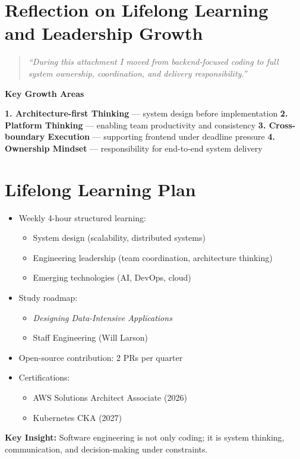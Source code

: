 \section{Reflection on Lifelong Learning and Leadership Growth}

\begin{quote}
\textit{“During this attachment I moved from backend-focused coding to full system ownership, coordination, and delivery responsibility.”}
\end{quote}

\textbf{Key Growth Areas}

\textbf{1. Architecture-first Thinking} --- system design before implementation  
\textbf{2. Platform Thinking} --- enabling team productivity and consistency  
\textbf{3. Cross-boundary Execution} --- supporting frontend under deadline pressure  
\textbf{4. Ownership Mindset} --- responsibility for end-to-end system delivery  

\section{Lifelong Learning Plan}

\begin{itemize}
\item Weekly 4-hour structured learning:
  \begin{itemize}
  \item System design (scalability, distributed systems)
  \item Engineering leadership (team coordination, architecture thinking)
  \item Emerging technologies (AI, DevOps, cloud)
  \end{itemize}

\item Study roadmap:
  \begin{itemize}
  \item \textit{Designing Data-Intensive Applications}
  \item Staff Engineering (Will Larson)
  \end{itemize}

\item Open-source contribution: 2 PRs per quarter

\item Certifications:
  \begin{itemize}
  \item AWS Solutions Architect Associate (2026)
  \item Kubernetes CKA (2027)
  \end{itemize}
\end{itemize}

\textbf{Key Insight:}  
Software engineering is not only coding; it is system thinking, communication, and decision-making under constraints.
